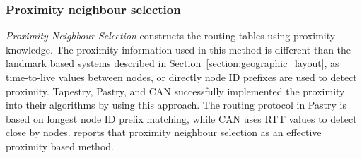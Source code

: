 %
%

\subsubsection{Proximity neighbour selection}
\emph{Proximity Neighbour Selection} constructs the routing tables using
proximity knowledge. The proximity information used in this method is different
than the landmark based systems described in
Section~\ref{section:geographic_layout}, as time-to-live values between nodes,
or directly node ID prefixes are used to detect proximity. Tapestry, Pastry, and
CAN successfully implemented the proximity into their algorithms by using this
approach. The routing protocol in Pastry is based on longest node ID prefix
matching, while CAN uses RTT values to detect close by nodes.
\cite{CDCR2002a} reports that proximity neighbour selection as an
effective proximity based method.
